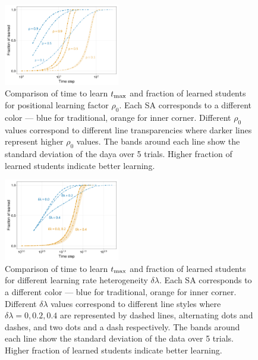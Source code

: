 \documentclass[twocolumn,secnumarabic,amssymb, nobibnotes, aps, prd]{revtex4-2}
\begin{document}
        \begin{figure}[htbp!]
            \centering
            \includegraphics[width=0.45\textwidth]{figures/2D-BPCAIH-analysis/comparison plots/ρ₀.png}
            \caption{Comparison of time to learn $t_{\rm max}$ and fraction of learned students for positional learning factor $\rho_0$.
            Each SA corresponds to a different color --- blue for traditional, orange for inner corner.
            Different $\rho_0$ values correspond to different line transparencies where darker lines represent higher $\rho_0$ values.
            The bands around each line show the standard deviation of the daya over 5 trials.
            Higher fraction of learned students indicate better learning.}
            \label{fig:comparison ρ₀}
        \end{figure}


        \begin{figure}[htbp!]
            \centering
            \includegraphics[width=0.45\textwidth]{figures/2D-BPCAIH-analysis/comparison plots/δλ.png}
            \caption{Comparison of time to learn $t_{\rm max}$ and fraction of learned students for different learning rate heterogeneity $\delta\lambda$.
            Each SA corresponds to a different color --- blue for traditional, orange for inner corner.
            Different $\delta\lambda$ values correspond to different line styles where $\delta\lambda=0,0.2,0.4$ are represented by dashed lines, alternating dots and dashes, and two dots and a dash respectively.
            The bands around each line show the standard deviation of the data over 5 trials.
            Higher fraction of learned students indicate better learning.}
            \label{fig:comparison δλ}
        \end{figure}
\end{document}

